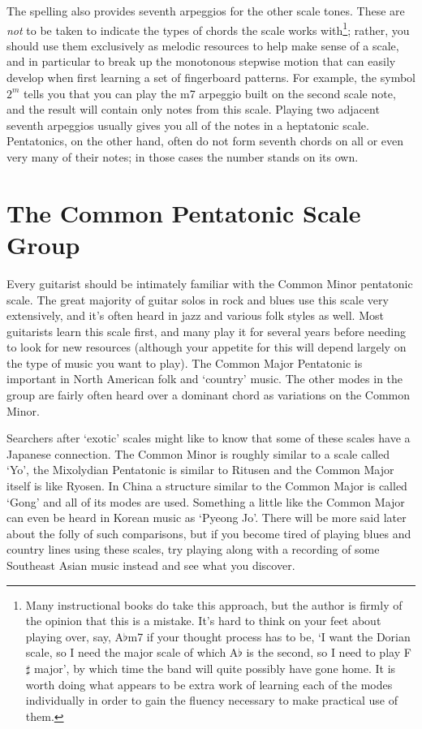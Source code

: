 \documentclass[english]{./gbook}
\begin{document}
\begin{large}
The spelling also provides seventh arpeggios for the other scale tones. These are \emph{not} to be taken to indicate the types of chords the scale works with\footnote{Many instructional books do take this approach, but the author is firmly of the opinion that this is a mistake. It's hard to think on your feet about playing over, say, A$\flat$m7 if your thought process has to be, `I want the Dorian scale, so I need the major scale of which A$\flat$ is the second, so I need to play F$\sharp$ major', by which time the band will quite possibly have gone home. It is worth doing what appears to be extra work of learning each of the modes individually in order to gain the fluency necessary to make practical use of them.}; rather, you should use them exclusively as melodic resources to help make sense of a scale, and in particular to break up the monotonous stepwise motion that can easily develop when first learning a set of fingerboard patterns. For example, the symbol $2^{m}$ tells you that you can play the m7 arpeggio built on the second scale note, and the result will contain only notes from this scale. Playing two adjacent seventh arpeggios usually gives you all of the notes in a heptatonic scale. Pentatonics, on the other hand, often do not form seventh chords on all or even very many of their notes; in those cases the number stands on its own. 

\section{The Common Pentatonic Scale Group}

Every guitarist should be intimately familiar with the Common Minor pentatonic scale. The great majority of guitar solos in rock and blues use this scale very extensively, and it's often heard in jazz and various folk styles as well. Most guitarists learn this scale first, and many play it for several years before needing to look for new resources (although your appetite for this will depend largely on the type of music you want to play). The Common Major Pentatonic is important in North American folk and `country' music. The other modes in the group are fairly often heard over a dominant chord as variations on the Common Minor.

Searchers after `exotic' scales might like to know that some of these scales have a Japanese connection. The Common Minor is roughly similar to a scale called `Yo', the Mixolydian Pentatonic is similar to Ritusen and the Common Major itself is like Ryosen. In China a structure similar to the Common Major is called `Gong' and all of its modes are used. Something a little like the Common Major can even be heard in Korean music as `Pyeong Jo'. There will be more said later about the folly of such comparisons, but if you become tired of playing blues and country lines using these scales, try playing along with a recording of some Southeast Asian music instead and see what you discover.


\end{large}
\end{document}
